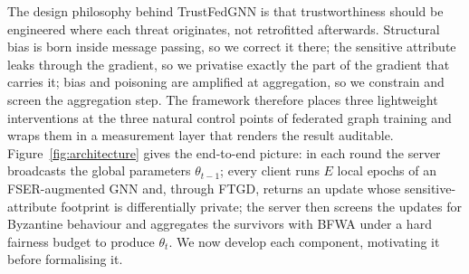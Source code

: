\documentclass[pdflatex,sn-mathphys-num]{sn-jnl}
\theoremstyle{thmstyleone}%
\theoremstyle{thmstyletwo}%
\theoremstyle{thmstylethree}%
\begin{document}
The design philosophy behind TrustFedGNN is that trustworthiness should be
engineered where each threat originates, not retrofitted afterwards. Structural
bias is born inside message passing, so we correct it there; the sensitive
attribute leaks through the gradient, so we privatise exactly the part of the
gradient that carries it; bias and poisoning are amplified at aggregation, so we
constrain and screen the aggregation step. The framework therefore places three
lightweight interventions at the three natural control points of federated graph
training and wraps them in a measurement layer that renders the result
auditable. Figure~\ref{fig:architecture} gives the end-to-end picture: in each
round the server broadcasts the global parameters $\theta_{t-1}$; every client
runs $E$ local epochs of an FSER-augmented GNN and, through FTGD, returns an
update whose sensitive-attribute footprint is differentially private; the server
then screens the updates for Byzantine behaviour and aggregates the survivors
with BFWA under a hard fairness budget to produce $\theta_t$. We now develop each
component, motivating it before formalising it.
\end{document}

